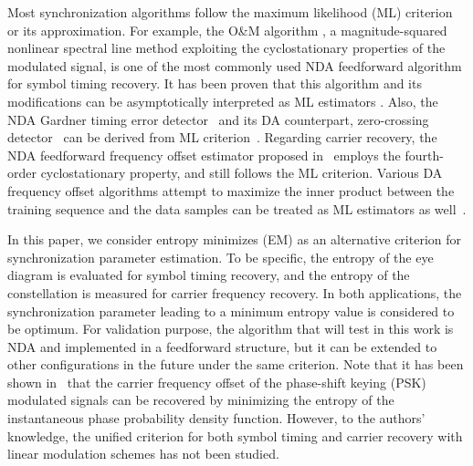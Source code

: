 \documentclass[journal,comsoc]{IEEEtran}
\begin{document}
Most synchronization algorithms follow the maximum likelihood (ML) criterion or its approximation.
For example, the O\&M algorithm \cite{Oerder1988}, a magnitude-squared nonlinear spectral line method exploiting the cyclostationary properties of the modulated signal, is one of the most commonly used NDA feedforward algorithm for symbol timing recovery.
It has been proven that this algorithm and its modifications can be asymptotically interpreted as ML estimators \cite{YanWang2002,Lopez-Salcedo2006}.
Also, the NDA Gardner timing error detector~\cite{Gardner1986} and its DA counterpart, zero-crossing detector~\cite{gardner1988demodulator} can be derived from ML criterion~\cite{Oerder1987}.
Regarding carrier recovery, the NDA feedforward frequency offset estimator proposed in~\cite{Wang2004} employs the fourth-order cyclostationary property, and still follows the ML criterion.
Various DA frequency offset algorithms attempt to maximize the inner product between the  training sequence and the data samples can be treated as ML estimators as well~\cite{mengali1997synchronization}.

In this paper, we consider entropy minimizes (EM) as an alternative criterion for synchronization parameter estimation.
To be specific, the entropy of the eye diagram is evaluated for symbol timing recovery, and the entropy of the constellation is measured for carrier frequency recovery.
In both applications, the synchronization parameter leading to a minimum entropy value is considered to be optimum.
For validation purpose, the algorithm that will test in this work is NDA and implemented in a feedforward structure, but it can be extended to other configurations in the future under the same criterion.
Note that it has been shown in~\cite{Pedzisz2006} that the carrier frequency offset of the phase-shift keying (PSK) modulated signals can be recovered by minimizing the entropy of the instantaneous phase probability density function.
However, to the authors' knowledge,  the unified criterion for both symbol timing and carrier recovery with linear modulation schemes has not been studied.
\end{document}

